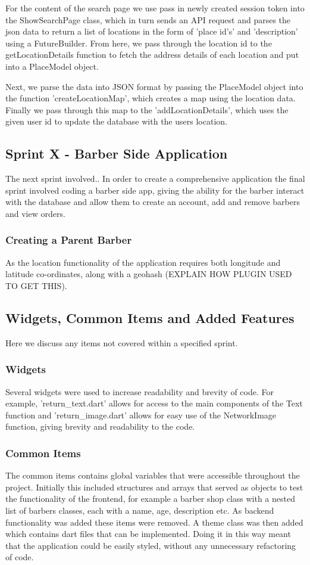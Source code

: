 \documentclass[12pt]{article}
\begin{document}
	For the content of the search page we use pass in newly created session token into the ShowSearchPage class, which in turn sends an API request and parses the json data to return a list of locations in the form of 'place id's' and 'description' using a FutureBuilder. From here, we pass through the location id to the getLocationDetails function to fetch the address details of each location and put into a PlaceModel object.
	
	Next, we parse the data into JSON format by passing the PlaceModel object into the function 'createLocationMap', which creates a map using the location data. Finally we pass through this map to the 'addLocationDetails', which uses the given user id to update the database with the users location.
	
	\subsection{Sprint X - Barber Side Application}
	The next sprint involved..
	In order to create a comprehensive application the final sprint involved coding a barber side app, giving the ability for the barber interact with the database and allow them to create an account, add and remove barbers and view orders.
	
	\subsubsection{Creating a Parent Barber}
	As the location functionality of the application requires both longitude and latitude co-ordinates, along with a geohash (EXPLAIN HOW PLUGIN USED TO GET THIS).
	
	\subsection{Widgets, Common Items and Added Features}
	Here we discuss any items not covered within a specified sprint.
	
	\subsubsection{Widgets}
	Several widgets were used to increase readability and brevity of code. For example, 'return\_text.dart' allows for access to the main components of the Text function and 'return\_image.dart' allows for easy use of the NetworkImage function, giving brevity and readability to the code.
	
	\subsubsection{Common Items}
	The common items contains global variables that were accessible throughout the project. Initially this included structures and arrays that served as objects to test the functionality of the frontend, for example a barber shop class with a nested list of barbers classes, each with a name, age, description etc. As backend functionality was added these items were removed. A theme class was then added which contains dart files that can be implemented. Doing it in this way meant that the application could be easily styled, without any unnecessary refactoring of code.
	
\end{document}

